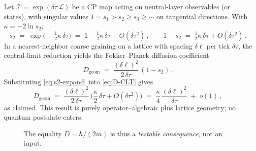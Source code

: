 \documentclass[11pt]{article}
\theoremstyle{plain}
\theoremstyle{definition}
\begin{document}
Let $\mathcal T=\exp(\delta\tau\,\mathcal L)$ be a CP map acting on neutral-layer observables (or states),
with singular values $1=s_1>s_2\ge s_3\ge\cdots$ on tangential directions.
With $\kappa=-2\ln s_2$,
\begin{equation}\label{eq:s2-expand}
  s_2 \;=\; \exp\!\big(-\tfrac12\kappa\,\delta\tau\big)
  \;=\; 1 - \tfrac12\kappa\,\delta\tau + O(\delta\tau^2)\,,
  \qquad 1-s_2 \;=\; \tfrac12\kappa\,\delta\tau + O(\delta\tau^2)\, .
\end{equation}
In a nearest-neighbor coarse graining on a lattice with spacing $\delta\ell$ per tick $\delta\tau$,
the central-limit reduction yields the Fokker–Planck diffusion coefficient
\begin{equation}\label{eq:D-CLT}
  D_{\mathrm{geom}} \;=\; \frac{(\delta\ell)^2}{2\,\delta\tau}\,(1-s_2)\, .
\end{equation}
Substituting \eqref{eq:s2-expand} into \eqref{eq:D-CLT} gives
\begin{equation}
  D_{\mathrm{geom}} \;=\; \frac{(\delta\ell)^2}{2\,\delta\tau}\,\Big(\frac{\kappa}{2}\,\delta\tau + O(\delta\tau^2)\Big)
  \;=\; \frac{\kappa}{4}\,\frac{(\delta\ell)^2}{\delta\tau} \;+\; o(1)\, ,
\end{equation}
as claimed.  This result is purely operator–algebraic plus lattice geometry; no quantum postulate enters.

\begin{figure}[t]
  \centering
  \caption*{The equality $D=\hbar/(2m)$ is thus a \emph{testable consequence}, not an input.}
\end{figure}

\end{document}
